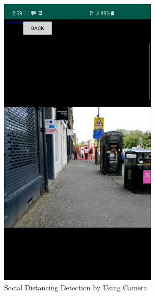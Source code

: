     \begin{figure}[!ht]
        \centering
        \includegraphics[width=3in]{images/chapter5/application/camera-detection.jpg}
        \caption{Social Distancing Detection by Using Camera}
        \label{appendix-b:camera}
    \end{figure}